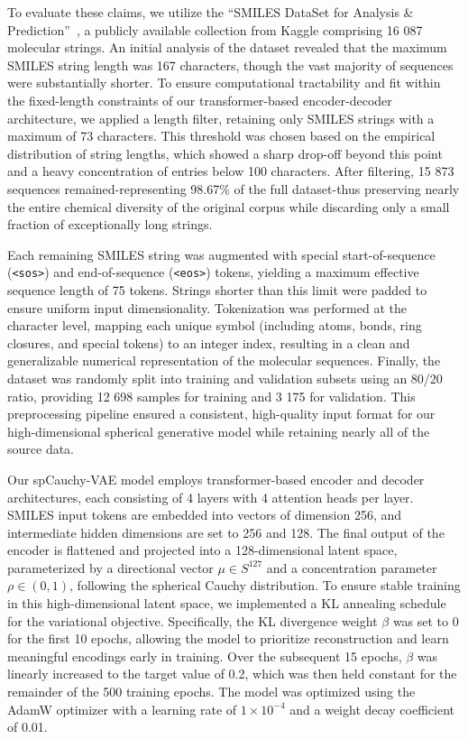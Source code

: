 \documentclass{article}
\begin{document}
To evaluate these claims, we utilize the ``SMILES DataSet for Analysis \& Prediction”~\citep{KaggleYanMaksiSMILES}, a publicly available collection from Kaggle comprising 16 087 molecular strings. An initial analysis of the dataset revealed that the maximum SMILES string length was 167 characters, though the vast majority of sequences were substantially shorter. To ensure computational tractability and fit within the fixed-length constraints of our transformer-based encoder-decoder architecture, we applied a length filter, retaining only SMILES strings with a maximum of 73 characters. This threshold was chosen based on the empirical distribution of string lengths, which showed a sharp drop-off beyond this point and a heavy concentration of entries below 100 characters. After filtering, 15 873 sequences remained-representing 98.67\% of the full dataset-thus preserving nearly the entire chemical diversity of the original corpus while discarding only a small fraction of exceptionally long strings.

Each remaining SMILES string was augmented with special start-of-sequence (\texttt{<sos>}) and end-of-sequence (\texttt{<eos>}) tokens, yielding a maximum effective sequence length of 75 tokens. Strings shorter than this limit were padded to ensure uniform input dimensionality. Tokenization was performed at the character level, mapping each unique symbol (including atoms, bonds, ring closures, and special tokens) to an integer index, resulting in a clean and generalizable numerical representation of the molecular sequences. Finally, the dataset was randomly split into training and validation subsets using an 80/20 ratio, providing 12 698 samples for training and 3 175 for validation. This preprocessing pipeline ensured a consistent, high-quality input format for our high-dimensional spherical generative model while retaining nearly all of the source data.

Our spCauchy-VAE model employs transformer-based encoder and decoder architectures, each consisting of 4 layers with 4 attention heads per layer. SMILES input tokens are embedded into vectors of dimension 256, and intermediate hidden dimensions are set to 256 and 128. The final output of the encoder is flattened and projected into a 128-dimensional latent space, parameterized by a directional vector \(\mu \in S^{127}\) and a concentration parameter \(\rho \in (0,1)\), following the spherical Cauchy distribution. To ensure stable training in this high-dimensional latent space, we implemented a KL annealing schedule for the variational objective. Specifically, the KL divergence weight \(\beta\) was set to 0 for the first 10 epochs, allowing the model to prioritize reconstruction and learn meaningful encodings early in training. Over the subsequent 15 epochs, \(\beta\) was linearly increased to the target value of 0.2, which was then held constant for the remainder of the 500 training epochs. The model was optimized using the AdamW optimizer with a learning rate of \(1 \times 10^{-4}\) and a weight decay coefficient of 0.01.
\end{document}
